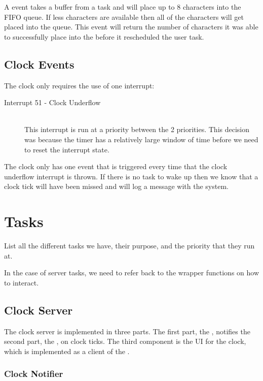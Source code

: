 \documentclass[pdftex,10pt,a4paper]{article}
\begin{document}
A  event takes a buffer from a task and will place up to 8
characters into the  FIFO queue. If less characters are available then
all of the characters will get placed into the queue. This event will return
the number of characters it was able to successfully place into the 
before it rescheduled the user task.

\subsection*{Clock Events}

The clock only requires the use of one interrupt:
\begin{description}
\item [Interrupt 51 - Clock Underflow] \hfill \\
	This interrupt is run at a priority between the 2  priorities.
	This decision was because the timer has a relatively large window of
	time before we need to reset the interrupt state.
\end{description}

The clock only has one event that is triggered every time that the clock
underflow interrupt is thrown. If there is no task to wake up then we know
that a clock tick will have been missed and will log a message with the system.


\section*{Tasks}

List all the different tasks we have, their purpose, and the priority
that they run at.

In the case of server tasks, we need to refer back to the wrapper
functions on how to interact.

\subsection*{Clock Server}

The clock server is implemented in three parts. The first part, the
, notifies the second part, the
, on clock ticks. The third component is the UI for
the clock, which is implemented as a client of the
.

\subsubsection*{Clock Notifier}
\end{document}
